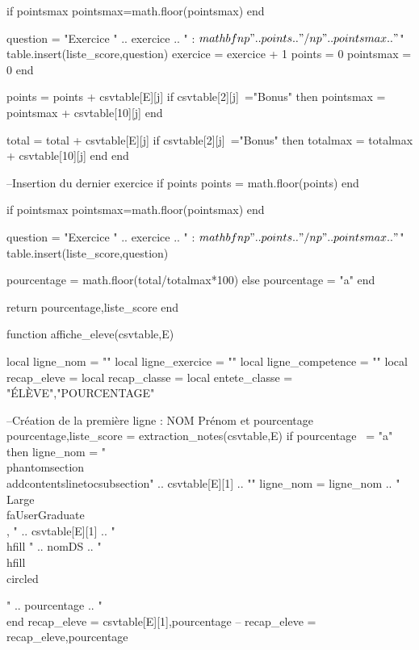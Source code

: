 \documentclass{article}
\newcommand*\circled[1]{\tikz[baseline=(char.base)]{
            \node[shape=circle,draw,inner sep=2pt] (char) {#1};}}
\begin{document}
\begin{luacode*}
                    if pointsmax%
                        pointsmax=math.floor(pointsmax)
                    end
    
                    question = "Exercice " .. exercice .. " : $\\mathbf{\\np{" .. points .. "}/\\np{" .. pointsmax .. "}}$"
                    table.insert(liste_score,question)
                    exercice = exercice + 1
                    points = 0
                    pointsmax = 0
                end
    
                points = points + csvtable[E][j]
                if csvtable[2][j]~="Bonus" then
                    pointsmax = pointsmax + csvtable[10][j]
                end
    
                total = total + csvtable[E][j]
                if csvtable[2][j]~="Bonus" then
                    totalmax = totalmax + csvtable[10][j]
                end
            end
    
            --Insertion du dernier exercice
            if points%
                points = math.floor(points)
            end
    
            if pointsmax%
                pointsmax=math.floor(pointsmax)
            end
    
            question = "Exercice " .. exercice .. " : $\\mathbf{\\np{" .. points .. "}/\\np{" .. pointsmax .. "}}$"
            table.insert(liste_score,question)
    
            pourcentage = math.floor(total/totalmax*100)
        else
            pourcentage = "a"
        end
    
        return pourcentage,liste_score
    end
    
    function affiche_eleve(csvtable,E)
       
        local ligne_nom = ""
        local ligne_exercice = ""
        local ligne_competence = ""
        local recap_eleve = {}
        local recap_classe = {}
        local entete_classe = {"ÉLÈVE","POURCENTAGE"}
    
        --Création de la première ligne : NOM Prénom et pourcentage
        pourcentage,liste_score = extraction_notes(csvtable,E)
        if pourcentage ~= "a" then
            ligne_nom = "\\phantomsection\\addcontentsline{toc}{subsection}{" .. csvtable[E][1] .. "}"
            ligne_nom = ligne_nom .. "\\Large\\faUserGraduate\\, " .. csvtable[E][1] .. "\\hfill " .. nomDS .. " \\hfill \\circled{" .. pourcentage .. "\\%
        end
        recap_eleve = {csvtable[E][1],pourcentage}
        -- recap_eleve = recap_eleve,pourcentage
    
}
\end{luacode*}
\end{document}
